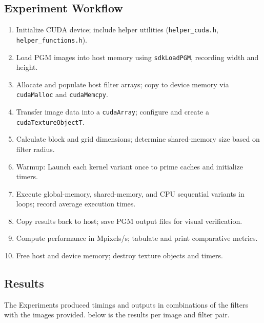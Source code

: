 \subsection{Experiment Workflow}
\begin{enumerate}
  \item Initialize CUDA device; include helper utilities (\texttt{helper\_cuda.h}, \texttt{helper\_functions.h}).
  \item Load PGM images into host memory using \texttt{sdkLoadPGM}, recording width and height.
  \item Allocate and populate host filter arrays; copy to device memory via \texttt{cudaMalloc} and \texttt{cudaMemcpy}.
  \item Transfer image data into a \texttt{cudaArray}; configure and create a \texttt{cudaTextureObjectT}.
  \item Calculate block and grid dimensions; determine shared-memory size based on filter radius.
  \item Warmup: Launch each kernel variant once to prime caches and initialize timers.
  \item Execute global-memory, shared-memory, and CPU sequential variants in loops; record average execution times.
  \item Copy results back to host; save PGM output files for visual verification.
  \item Compute performance in Mpixels/s; tabulate and print comparative metrics.
  \item Free host and device memory; destroy texture objects and timers.
\end{enumerate}

\subsection{Results}

The Experiments produced timings and outputs in combinations of the filters with the images provided. below is the results per image and filter pair.

